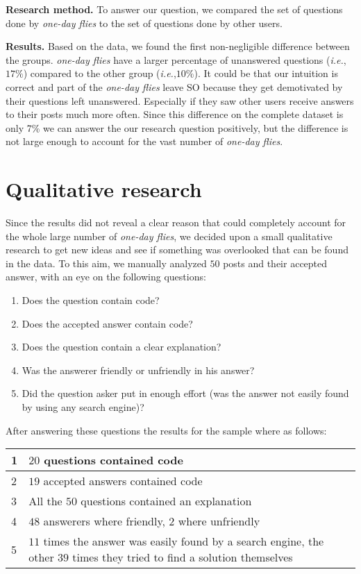 \documentclass[conference]{IEEEtran}
\newcommand{\ie}{\emph{i.e.},\xspace}
\newcommand\odf{\emph{one-day flies}\xspace}
\begin{document}
\textbf{Research method.} To answer our question, we compared the set of
questions done by \odf to the set of questions done by other users.

\textbf{Results.} Based on the data, we found the first non-negligible
difference between the groups. \odf have a larger percentage of unanswered
questions (\ie $17\%$) compared to the other group (\ie $10\%$). It could be
that our intuition is correct and part of the \odf leave SO because they get
demotivated by their questions left unanswered. Especially if they saw other
users receive answers to their posts much more often. Since this difference on
the complete dataset is only 7\% we can answer the our research question
positively, but the difference is not large enough to account for the vast
number of \odf.



\section{Qualitative research}\label{QualitativeResearch}
Since the results did not reveal a clear reason that could completely account
for the whole large number of \odf, we decided upon a small qualitative 
research to get new ideas and see if something was overlooked that can be found
in the data. To this aim, we manually analyzed $50$ posts and their
accepted answer, with an eye on the following questions:

\begin{enumerate}
\item Does the question contain code?
\item Does the accepted answer contain code?
\item Does the question contain a clear explanation?
\item Was the answerer friendly or unfriendly in his answer?
\item Did the question asker put in enough effort (was the answer not easily
found by using any search engine)?  
\end{enumerate}

After answering these questions the results for the sample where as follows:
\newline
\newline
\begin{tabular}{ | l | p{8cm} | }
\hline
  1 & $20$ questions contained code \\
\hline
  2 & $19$ accepted answers contained code \\
\hline
  3 & All the $50$ questions contained an explanation \\
\hline
  4 & $48$ answerers where friendly, $2$ where unfriendly \\
\hline
  5 & $11$ times the answer was easily found by a search engine, the other $39$ times they tried to find a solution themselves \\
\hline
\end{tabular}
\newline
\newline
\end{document}
